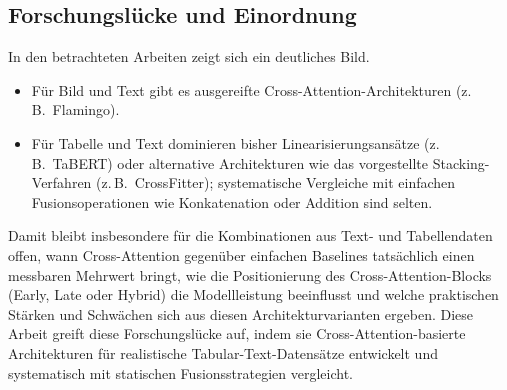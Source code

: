 \subsection{Forschungslücke und Einordnung}
In den betrachteten Arbeiten zeigt sich ein deutliches Bild.
\begin{itemize}
    \item Für Bild und Text gibt es ausgereifte Cross-Attention-Architekturen (z.\,B.\ Flamingo).
    \item Für Tabelle und Text dominieren bisher Linearisierungsansätze (z.\,B.\ TaBERT) oder alternative Architekturen wie das vorgestellte Stacking-Verfahren (z.\,B.\ CrossFitter); systematische Vergleiche mit einfachen Fusionsoperationen wie Konkatenation oder Addition sind selten.
\end{itemize}

Damit bleibt insbesondere für die Kombinationen aus Text- und Tabellendaten offen, wann Cross-Attention gegenüber einfachen Baselines tatsächlich einen messbaren Mehrwert bringt, wie die Positionierung des Cross-Attention-Blocks (Early, Late oder Hybrid) die Modellleistung beeinflusst und welche praktischen Stärken und Schwächen sich aus diesen Architekturvarianten ergeben. Diese Arbeit greift diese Forschungslücke auf, indem sie Cross-Attention-basierte Architekturen für realistische Tabular-Text-Datensätze entwickelt und systematisch mit statischen Fusionsstrategien vergleicht.
